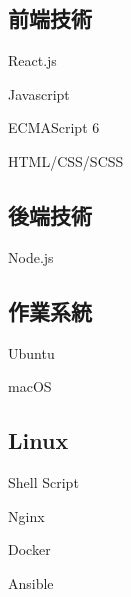\documentclass[]{deedy-resume-openfont-ch}
\begin{document}
\begin{minipage}[t]{0.5\textwidth}
\begin{minipage}[t]{0.45\textwidth}
    \subsection{前端技術}
    \vspace{\topsep}
    \vspace{\topsep}
    \begin{tightemize}
        \item React.js
        \item Javascript
        \item ECMAScript 6
        \item HTML/CSS/SCSS
    \end{tightemize}
\end{minipage}
\hfill
\begin{minipage}[t]{0.45\textwidth}
    \subsection{後端技術}
    \vspace{\topsep}
    \vspace{\topsep}
    \begin{tightemize}
        \item Node.js
    \end{tightemize}
\end{minipage}

\vspace{\topsep}
\begin{minipage}[t]{0.45\textwidth}
    \subsection{作業系統}
    \vspace{\topsep}
    \vspace{\topsep}
    \begin{tightemize}
        \item Ubuntu
        \item macOS
    \end{tightemize}
\end{minipage}
\hfill
\begin{minipage}[t]{0.45\textwidth}
    \subsection{Linux}
    \vspace{\topsep}
    \vspace{\topsep}
    \begin{tightemize}
        \item Shell Script
        \item Nginx
        \item Docker
        \item Ansible
    \end{tightemize}
\end{minipage}


\end{minipage}
\end{document}
